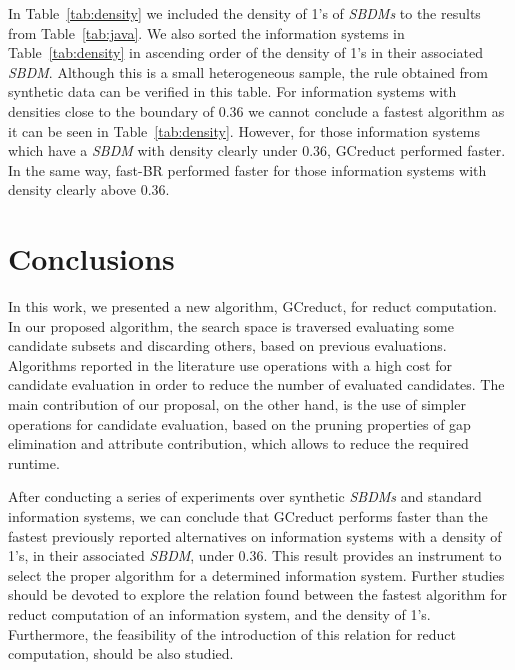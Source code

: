\documentclass[authoryear,preprint,review,12pt]{elsarticle}
\begin{document}
	In Table~\ref{tab:density} we included the density of 1's of \textit{SBDMs} to the results from Table~\ref{tab:java}. We also sorted the information systems in Table~\ref{tab:density} in ascending order of the density of 1's in their associated \textit{SBDM}. Although this is a small heterogeneous sample, the rule obtained from synthetic data can be verified in this table. For information systems with densities close to the boundary of 0.36 we cannot conclude a fastest algorithm as it can be seen in Table~\ref{tab:density}. However, for those information systems which have a \textit{SBDM} with density clearly under 0.36, GCreduct performed faster. In the same way, fast-BR performed faster for those information systems with density clearly above 0.36.

\section{Conclusions}\label{conclusions}
	In this work, we presented a new algorithm, GCreduct, for reduct computation. In our proposed algorithm, the search space is traversed evaluating some candidate subsets and discarding others, based on previous evaluations. Algorithms reported in the literature use operations with a high cost for candidate evaluation in order to reduce the number of evaluated candidates. The main contribution of our proposal, on the other hand, is the use of simpler operations for candidate evaluation, based on the pruning properties of gap elimination and attribute contribution, which allows to reduce the required runtime. 
	
	After conducting a series of experiments over synthetic \textit{SBDMs} and standard information systems, we can conclude that GCreduct performs faster than the fastest previously reported alternatives on information systems with a density of 1's, in their associated \textit{SBDM}, under 0.36. This result provides an instrument to select the proper algorithm for a determined information system. Further studies should be devoted to explore the relation found between the fastest algorithm for reduct computation of an information system, and the density of 1's. Furthermore, the feasibility of the introduction of this relation for reduct computation, should be also studied.
	
\newpage 
{}

\end{document}
